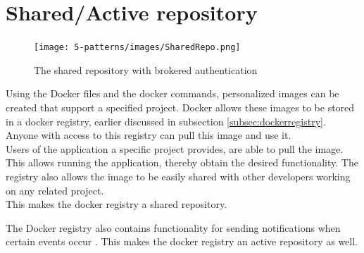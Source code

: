 

\section{Shared/Active repository}
 \begin{figure}[H]
 \centering
 \texttt{[image: 5-patterns/images/SharedRepo.png]}
 \caption{The shared repository with brokered authentication}
 \label{fig:docker-registry}
 \end{figure}
Using the Docker files and the docker commands, personalized images can be created that support a specified project. Docker allows these images to be stored in a docker registry, earlier discussed in subsection \ref{subsec:dockerregistry}. Anyone with access to this registry can pull this image and use it.\\
Users of the application a specific project provides, are able to pull the image. This allows running the application, thereby obtain the desired functionality. The registry also allows the image to be easily shared with other developers working on any related project.\\
This makes the docker registry a shared repository.


The Docker registry also contains functionality for sending notifications when certain events occur \cite{docknotif}. This makes the docker registry an active repository as well.

